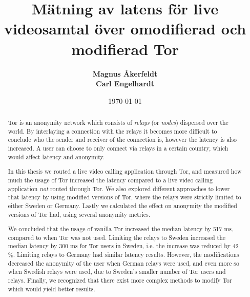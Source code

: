 \documentclass{kththesis}
\title{Mätning av latens för live videosamtal över omodifierad och modifierad Tor}
\author{
  \textbf{Magnus Åkerfeldt}\\
  \textbf{Carl Engelhardt}
}
\date{\today}
\begin{document}
\frontmatter
\titlepage
\begin{abstract}
    Tor is an anonymity network which consists of \emph{relays} (or \emph{nodes}) dispersed over the world. By interlaying a connection with the relays it becomes more difficult to conclude who the sender and receiver of the connection is, however the latency is also increased. A user can choose to only connect via relays in a certain country, which would affect latency and anonymity.
    
    In this thesis we routed a live video calling application through Tor, and measured how much the usage of Tor increased the latency compared to a live video calling application \emph{not} routed through Tor. We also explored different approaches to lower that latency by using modified versions of Tor, where the relays were strictly limited to either Sweden or Germany. Lastly we calculated the effect on anonymity the modified versions of Tor had, using several anonymity metrics.
    
    We concluded that the usage of vanilla Tor increased the median latency by 517 ms, compared to when Tor was not used. Limiting the relays to Sweden increased the median latency by 300 ms for Tor users in Sweden, i.e. the increase was reduced by 42 \%. Limiting relays to Germany had similar latency results. However, the modifications decreased the anonymity of the user when German relays were used, and even more so when Swedish relays were used, due to Sweden's smaller number of Tor users and relays. Finally, we recognized that there exist more complex methods to modify Tor which would yield better results.
\end{abstract}
\end{document}
